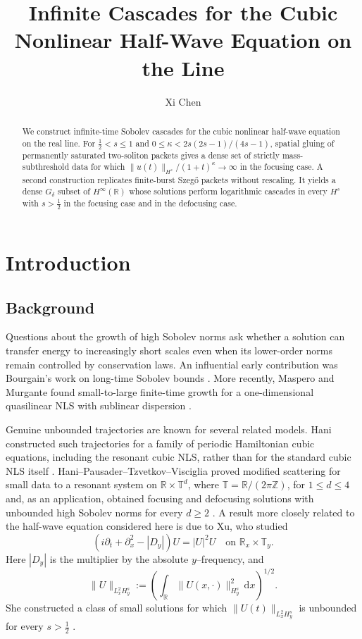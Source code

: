 \documentclass[11pt,reqno]{amsart}
\title[Infinite Cascades for the cubic nonlinear half-wave equation]
{Infinite Cascades for the Cubic Nonlinear Half-Wave Equation on the Line}
\author{Xi Chen}
\numberwithin{equation}{section}
\theoremstyle{remark}
\newcommand{\R}{\mathbb R}
\newcommand{\half}{\frac12}
\begin{document}
\begin{abstract}
We construct infinite-time Sobolev cascades for the cubic nonlinear half-wave equation
on the real line.  For $\half<s\leq1$ and
$0\leq\kappa<2s(2s-1)/(4s-1)$, spatial gluing of permanently saturated
two-soliton packets gives a dense set of strictly mass-subthreshold
data for which $\|u(t)\|_{H^s}/(1+t)^\kappa\to\infty$ in the focusing case.  A second construction
replicates finite-burst Szeg\H{o} packets without rescaling.  It yields a dense $G_\delta$ subset of $H^\infty(\R)$ whose solutions perform
logarithmic cascades in every $H^s$ with $s>\half$ in the focusing case and in the defocusing case.
\end{abstract}

\maketitle

\section{Introduction}

\subsection{Background}

Questions about the growth of high Sobolev norms ask whether a solution can
transfer energy to increasingly short scales even when its lower-order norms
remain controlled by conservation laws.  An influential early contribution
was Bourgain's work on long-time Sobolev bounds \cite{BourgainGrowth}.  More
recently, Maspero and Murgante found small-to-large finite-time growth for a
one-dimensional quasilinear NLS with sublinear dispersion
\cite{MasperoMurgante}.

Genuine unbounded trajectories are known for several related models.  Hani
constructed such trajectories for a family of periodic Hamiltonian cubic
equations, including the resonant cubic NLS, rather than for the standard
cubic NLS itself \cite{Hani}.  Hani--Pausader--Tzvetkov--Visciglia proved
modified scattering for small data to a resonant system on
$\mathbb R\times\mathbb T^d$, where
$\mathbb T=\mathbb R/(2\pi\mathbb Z)$, for $1\leq d\leq4$ and, as an application,
obtained focusing and defocusing solutions with unbounded high Sobolev norms
for every $d\geq2$ \cite{HPTV}.
A result more closely related to the half-wave equation considered here is due
to Xu, who studied
\[
 (i\partial_t+\partial_x^2-|D_y|)U=|U|^2U
 \quad\text{on }\mathbb R_x\times\mathbb T_y.
\]
Here $|D_y|$ is the multiplier by the absolute $y$--frequency, and
\[
 \|U\|_{L_x^2H_y^s}
 :=\left(\int_{\mathbb R}\|U(x,\cdot)\|_{H_y^s}^2\,\mathrm dx\right)^{1/2}.
\]
She constructed a class of small solutions for which
$\|U(t)\|_{L_x^2H_y^s}$ is unbounded for every $s>\half$
\cite{XuWaveguide}.
\end{document}
